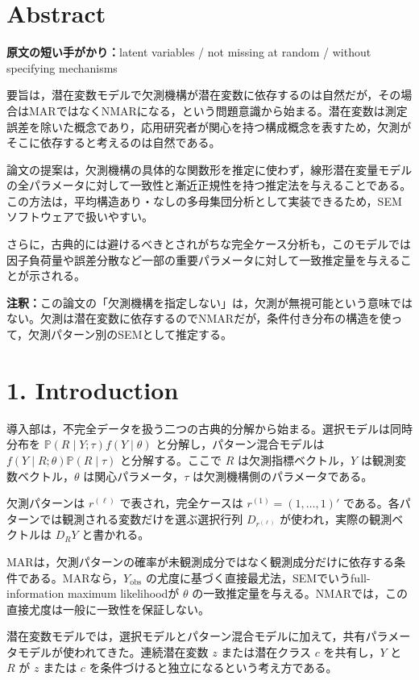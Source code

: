 \documentclass[dvipdfmx,autodetect-engine]{jsarticle}
\newcommand{\Prb}{\mathbb{P}}
\newcommand{\note}[1]{\par\smallskip\noindent\textbf{注釈：}#1\par\smallskip}
\newcommand{\cue}[1]{\par\smallskip\noindent\textbf{原文の短い手がかり：}#1\par\smallskip}
\begin{document}
\section{Abstract}

\cue{latent variables / not missing at random / without specifying mechanisms}

要旨は，潜在変数モデルで欠測機構が潜在変数に依存するのは自然だが，その場合はMARではなくNMARになる，という問題意識から始まる。潜在変数は測定誤差を除いた概念であり，応用研究者が関心を持つ構成概念を表すため，欠測がそこに依存すると考えるのは自然である。

論文の提案は，欠測機構の具体的な関数形を推定に使わず，線形潜在変量モデルの全パラメータに対して一致性と漸近正規性を持つ推定法を与えることである。この方法は，平均構造あり・なしの多母集団分析として実装できるため，SEMソフトウェアで扱いやすい。

さらに，古典的には避けるべきとされがちな完全ケース分析も，このモデルでは因子負荷量や誤差分散など一部の重要パラメータに対して一致推定量を与えることが示される。

\note{この論文の「欠測機構を指定しない」は，欠測が無視可能という意味ではない。欠測は潜在変数に依存するのでNMARだが，条件付き分布の構造を使って，欠測パターン別のSEMとして推定する。}

\section{1. Introduction}

導入部は，不完全データを扱う二つの古典的分解から始まる。選択モデルは同時分布を $\Prb(R\mid Y;\tau)f(Y\mid\theta)$ と分解し，パターン混合モデルは $f(Y\mid R;\theta)\Prb(R\mid\tau)$ と分解する。ここで $R$ は欠測指標ベクトル，$Y$ は観測変数ベクトル，$\theta$ は関心パラメータ，$\tau$ は欠測機構側のパラメータである。

欠測パターンは $r^{(\ell)}$ で表され，完全ケースは $r^{(1)}=(1,\ldots,1)'$ である。各パターンでは観測される変数だけを選ぶ選択行列 $D_{r^{(\ell)}}$ が使われ，実際の観測ベクトルは $D_RY$ と書かれる。

MARは，欠測パターンの確率が未観測成分ではなく観測成分だけに依存する条件である。MARなら，$Y_{\mathrm{obs}}$ の尤度に基づく直接最尤法，SEMでいうfull-information maximum likelihoodが $\theta$ の一致推定量を与える。NMARでは，この直接尤度は一般に一致性を保証しない。

潜在変数モデルでは，選択モデルとパターン混合モデルに加えて，共有パラメータモデルが使われてきた。連続潜在変数 $z$ または潜在クラス $c$ を共有し，$Y$ と $R$ が $z$ または $c$ を条件づけると独立になるという考え方である。
\end{document}
